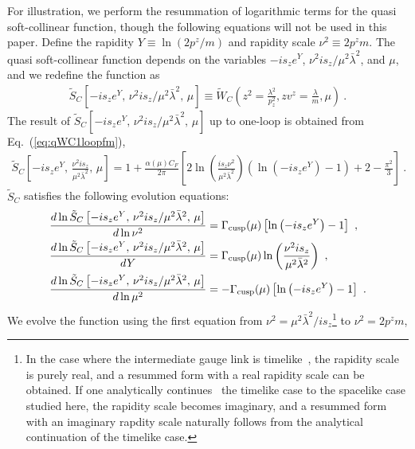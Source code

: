 \documentclass[a4paper,11pt]{article}
\begin{document}
For illustration, we perform the resummation of logarithmic terms for the quasi soft-collinear function, though the following equations will not be used in this paper. Define the rapidity $Y \equiv \ln\left(2p^z/m\right)$ and rapidity scale $\nu^2 \equiv 2 p^z m$. The quasi soft-collinear function depends on the variables $-i s_z e^{Y}$,  $\nu^2 i s_z / \mu^2 \bar{\lambda}^2$, and $\mu$, and we redefine the function as
\begin{align}
\tilde{S}_C\left[-i s_z e^{Y}, \, \nu^2 i s_z / \mu^2 \bar{\lambda}^2, \, \mu\right]
\equiv \tilde W_C\left(z^2=\frac{\lambda^2}{p_z^2}, z v^{z} = \frac{\lambda}{m}, \mu \right) \ .
\end{align}
The result of $\tilde{S}_C\left[-i s_z e^{Y}, \, \nu^2 i s_z / \mu^2 \bar{\lambda}^2, \, \mu\right]$ up to one-loop is obtained from Eq.~(\ref{eq:qWC1loopfm}),
\begin{align}
\tilde{S}_C\left[-i s_z e^{Y}, \, \frac{\nu^2 i s_z}{\mu^2 \bar{\lambda}^2}, \, \mu\right]
= 1 + \frac{\alpha(\mu) C_F}{2\pi} \left[ 2 \ln\left(\frac{i s_z \nu^2}{\mu^2 \bar{\lambda}^2}\right) \left( \ln\left(-i s_z e^{Y}\right) - 1 \right) + 2 - \frac{\pi^2}{3}\right] \ .
\end{align}
$\tilde{S}_C$ satisfies the following evolution equations:
\begin{align}
&\frac{d \ln \tilde{S}_C\left[-i s_z e^{Y}, \, \nu^2 i s_z / \mu^2 \bar{\lambda}^2, \, \mu\right]}{d\ln \nu^2}
= \Gamma_{\rm cusp}(\mu) \left[ \ln\left(-i s_z e^{Y}\right) - 1 \right] \ , \nonumber\\
&\frac{d \ln \tilde{S}_C\left[-i s_z e^{Y}, \, \nu^2 i s_z / \mu^2 \bar{\lambda}^2, \, \mu\right]}{dY} 
= \Gamma_{\rm cusp}(\mu) \ln\left(\frac{\nu^2 i s_z}{\mu^2 \bar{\lambda}^2}\right) \ , \nonumber\\
&\frac{d \ln \tilde{S}_C\left[-i s_z e^{Y}, \, \nu^2 i s_z / \mu^2 \bar{\lambda}^2, \, \mu\right]}{d\ln \mu^2} 
= -\Gamma_{\rm cusp}(\mu) \left[  \ln\left(-i s_z e^{Y}\right) - 1 \right] \ .
\end{align}
We evolve the function using the first equation from $\nu^2 = \mu^2 \bar{\lambda}^2/i s_z$\footnote{In the case where the intermediate gauge link is timelike~\cite{Jain:2008gb}, the rapidity scale is purely real, and a resummed form with a real rapidity scale can be obtained. If one analytically continues~\cite{Ji:2023pba} the timelike case to the spacelike case studied here, the rapidity scale becomes imaginary, and a resummed form with an imaginary rapdity scale naturally follows from the analytical continuation of the timelike case.} to $\nu^2 = 2 p^z m$,
\end{document}
